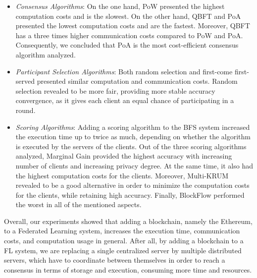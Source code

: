 \begin{itemize}
    \item \textit{Consensus Algorithms}: On the one hand, PoW presented the highest computation costs and is the slowest. On the other hand, QBFT and PoA presented the lowest computation costs and are the fastest. Moreover, QBFT has a three times higher communication costs compared to PoW and PoA. Consequently, we concluded that PoA is the most cost-efficient consensus algorithm analyzed. %
    
    \item \textit{Participant Selection Algorithms}: Both random selection and first-come first-served presented similar computation and communication costs. Random selection revealed to be more fair, providing more stable accuracy convergence, as it gives each client an equal chance of participating in a round.
    
    \item \textit{Scoring Algorithms}: Adding a scoring algorithm to the BFS system increased the execution time up to twice as much, depending on whether the algorithm is executed by the servers of the clients. Out of the three scoring algorithms analyzed, Marginal Gain provided the highest accuracy with increasing number of clients and increasing privacy degree. At the same time, it also had the highest computation costs for the clients. Moreover, Multi-KRUM revealed to be a good alternative in order to minimize the computation costs for the clients, while retaining high accuracy. Finally, BlockFlow performed the worst in all of the mentioned aspects. %
\end{itemize}

Overall, our experiments showed that adding a blockchain, namely the Ethereum, to a Federated Learning system, increases the execution time, communication costs, and computation usage in general. After all, by adding a blockchain to a FL system, we are replacing a single centralized server by multiple distributed servers, which have to coordinate between themselves in order to reach a consensus in terms of storage and execution, consuming more time and resources. %

